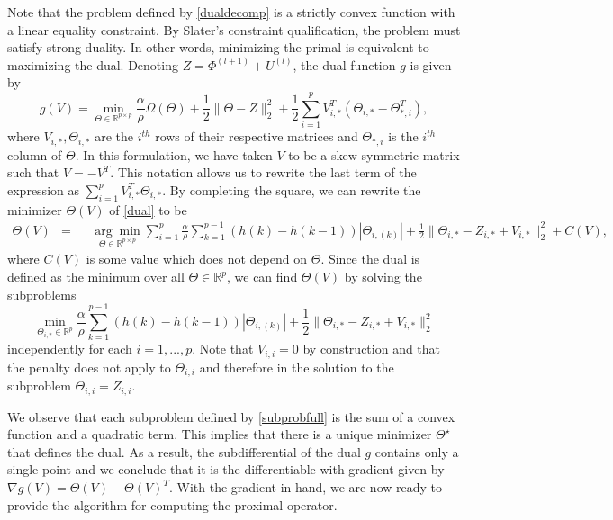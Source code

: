 \documentclass{uwstat572}
\theoremstyle{remark}
\theoremstyle{definition}
\begin{document}
Note that the problem defined by \eqref{dualdecomp} is a strictly convex function with a linear equality constraint.  By Slater's constraint qualification, the problem must satisfy strong duality.  In other words, minimizing the primal is equivalent to maximizing the dual.  Denoting $Z = \Phi^{(l+1)} + U^{(l)}$, the dual function $g$ is given by
\begin{equation}\label{dual}
g(V) = \min_{\Theta \in \mathbb{R}^{p \times p} } \frac{\alpha}{\rho} \Omega(\Theta) + \frac{1}{2} \| \Theta - Z \|_2^2 + \frac{1}{2}\sum_{i=1}^p V_{i,*}^T ( \Theta_{i,*} - \Theta_{*, i}^T),
\end{equation}
where $V_{i,*}, \Theta_{i,*}$ are the $i^{th}$ rows of their respective matrices and $\Theta_{*,i}$ is the $i^{th}$ column of $\Theta$.  In this formulation, we have taken $V$ to be a skew-symmetric matrix such that $V = - V^T$.  This notation allows us to rewrite the last term of the expression as $\sum_{i=1}^p V_{i,*}^T \Theta_{i,*}$.
By completing the square, we can rewrite the minimizer $\Theta(V)$ of \eqref{dual} to be
\begin{equation*}
\begin{aligned}
\Theta(V) &= && \underset{\Theta \in \mathbb{R}^{p \times p}}{\arg\min} \sum_{i=1}^p \frac{\alpha}{\rho} \sum_{k=1}^{p-1} (h(k) - h(k-1)) |\Theta_{i,(k)}| + \frac{1}{2} \| \Theta_{i,*} - Z_{i,*} + V_{i,*} \|_2^2 + C(V),
\end{aligned}
\end{equation*}
where $C(V)$ is some value which does not depend on $\Theta$.  Since the dual is defined as the minimum over all $\Theta \in \mathbb{R}^p$, we can find $\Theta(V)$ by solving the subproblems
\begin{equation}\label{subprobfull}
    \min_{\Theta_{i,*} \in \mathbb{R}^p} \frac{\alpha}{\rho} \sum_{k=1}^{p-1} (h(k) - h(k-1))|\Theta_{i,(k)}| + \frac{1}{2} \| \Theta_{i,*} - Z_{i,*} + V_{i,*} \|_2^2
\end{equation}
independently for each $i=1,...,p$.  Note that $V_{i,i} = 0$ by construction and that the penalty does not apply to $\Theta_{i,i}$ and therefore in the solution to the subproblem $\Theta_{i,i} = Z_{i,i}$.  

We observe that each subproblem defined by \eqref{subprobfull} is the sum of a convex function and a quadratic term.  This implies that there is a unique minimizer $\Theta^{\star}$ that defines the dual.  As a result, the subdifferential of the dual $g$ contains only a single point and we conclude that it is the differentiable with gradient given by $\nabla g(V) = \Theta(V) - \Theta(V)^T$. With the gradient in hand, we are now ready to provide the algorithm for computing the proximal operator.
\end{document}
